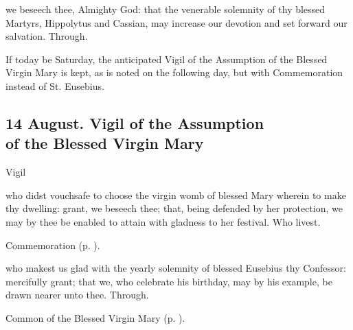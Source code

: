 \memorialCollect\label{HippolytusCassianCollect}
 we beseech thee, Almighty God: that the venerable solemnity of thy blessed Martyrs, Hippolytus and Cassian, may increase our devotion and set forward our salvation. Through.

\begin{rubric}
	If today be Saturday, the anticipated Vigil of the Assumption of the Blessed Virgin Mary is kept, as is noted on the following day, but with Commemoration  instead of St. Eusebius.
\end{rubric}


\subsection{{\color{LentenViolet}14 August. Vigil of the Assumption\\of the Blessed Virgin Mary}}
\begin{inhead}
Vigil
\end{inhead}


{} who didst vouchsafe to choose the virgin womb of blessed Mary wherein to make thy dwelling: grant, we beseech thee; that, being defended by her protection, we may by thee be enabled to attain with gladness to her festival. Who livest.

\begin{rubric}
	Commemoration  (p. \pageref{EusebiusCollect}).
\end{rubric}


\clearpage
{}

\memorialCollect\label{EusebiusCollect}
 who makest us glad with the yearly solemnity of blessed Eusebius thy Confessor: mercifully grant; that we, who celebrate his birthday, may by his example, be drawn nearer unto thee. Through.



\begin{rubric}
	Common of the Blessed Virgin Mary (p. \pageref{CommonBVM}).
\end{rubric}


